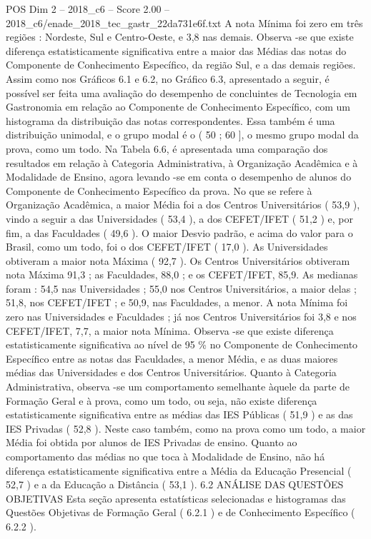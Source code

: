 \begin{textsample}{POS Dim 2 – 2018\_c6 – Score 2.00 – 2018\_c6/enade\_2018\_tec\_gastr\_22da731e6f.txt}
A nota Mínima foi zero em três regiões : Nordeste, Sul e Centro-Oeste, e 3,8 nas demais.
Observa -se que existe diferença estatisticamente significativa entre a maior das Médias das notas do Componente de Conhecimento Específico, da região Sul, e a das demais regiões.
Assim como nos Gráficos 6.1 e 6.2, no Gráfico 6.3, apresentado a seguir, é possível ser feita uma avaliação do desempenho de concluintes de Tecnologia em Gastronomia em relação ao Componente de Conhecimento Específico, com um histograma da distribuição das notas correspondentes.
Essa também é uma distribuição unimodal, e o grupo modal é o ( 50 ; 60 ], o mesmo grupo modal da prova, como um todo.
Na Tabela 6.6, é apresentada uma comparação dos resultados em relação à Categoria Administrativa, à Organização Acadêmica e à Modalidade de Ensino, agora levando -se em conta o desempenho de alunos do Componente de Conhecimento Específico da prova.
No que se refere à Organização Acadêmica, a maior Média foi a dos Centros Universitários ( 53,9 ), vindo a seguir a das Universidades ( 53,4 ), a dos CEFET/IFET ( 51,2 ) e, por fim, a das Faculdades ( 49,6 ).
O maior Desvio padrão, e acima do valor para o Brasil, como um todo, foi o dos CEFET/IFET ( 17,0 ).
As Universidades obtiveram a maior nota Máxima ( 92,7 ).
Os Centros Universitários obtiveram nota Máxima 91,3 ; as Faculdades, 88,0 ; e os CEFET/IFET, 85,9.
As medianas foram : 54,5 nas Universidades ; 55,0 nos Centros Universitários, a maior delas ; 51,8, nos CEFET/IFET ; e 50,9, nas Faculdades, a menor.
A nota Mínima foi zero nas Universidades e Faculdades ; já nos Centros Universitários foi 3,8 e nos CEFET/IFET, 7,7, a maior nota Mínima.
Observa -se que existe diferença estatisticamente significativa ao nível de 95 \% no Componente de Conhecimento Específico entre as notas das Faculdades, a menor Média, e as duas maiores médias das Universidades e dos Centros Universitários.
Quanto à Categoria Administrativa, observa -se um comportamento semelhante àquele da parte de Formação Geral e à prova, como um todo, ou seja, não existe diferença estatisticamente significativa entre as médias das IES Públicas ( 51,9 ) e as das IES Privadas ( 52,8 ).
Neste caso também, como na prova como um todo, a maior Média foi obtida por alunos de IES Privadas de ensino.
Quanto ao comportamento das médias no que toca à Modalidade de Ensino, não há diferença estatisticamente significativa entre a Média da Educação Presencial ( 52,7 ) e a da Educação a Distância ( 53,1 ). 6.2 ANÁLISE DAS QUESTÕES OBJETIVAS Esta seção apresenta estatísticas selecionadas e histogramas das Questões Objetivas de Formação Geral ( 6.2.1 ) e de Conhecimento Específico ( 6.2.2 ).

\end{textsample}
